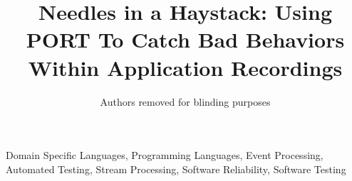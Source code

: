 \documentclass{IEEEtran}
\begin{document}
\title{Needles in a Haystack: Using PORT To Catch Bad Behaviors Within
Application Recordings}

\newcommand{\showurlx}{[redacted]}

\author{Authors removed for blinding purposes}

\maketitle


\begin{IEEEkeywords}
Domain Specific Languages,
Programming Languages,
Event Processing,
Automated Testing,
Stream Processing,
Software Reliability,
Software Testing
\end{IEEEkeywords}











\end{document}

